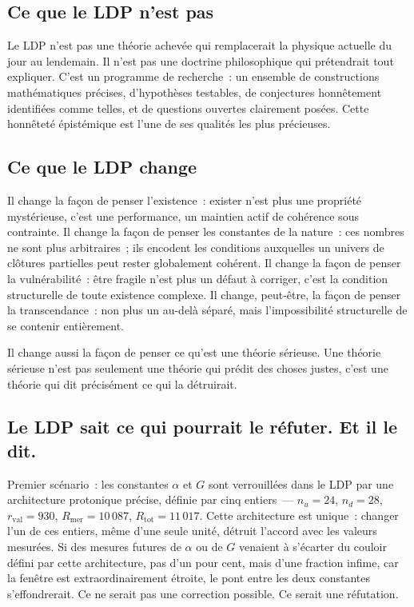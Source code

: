 \documentclass[12pt, a4paper, openright]{book}
\begin{document}
\subsection*{Ce que le LDP n'est pas}

Le LDP n'est pas une théorie achevée qui remplacerait la physique actuelle du jour au lendemain. Il n'est pas une doctrine philosophique qui prétendrait tout expliquer. C'est un programme de recherche~: un ensemble de constructions mathématiques précises, d'hypothèses testables, de conjectures honnêtement identifiées comme telles, et de questions ouvertes clairement posées. Cette honnêteté épistémique est l'une de ses qualités les plus précieuses.

\subsection*{Ce que le LDP change}

Il change la façon de penser l'existence~: exister n'est plus une propriété mystérieuse, c'est une performance, un maintien actif de cohérence sous contrainte. Il change la façon de penser les constantes de la nature~: ces nombres ne sont plus arbitraires~; ils encodent les conditions auxquelles un univers de clôtures partielles peut rester globalement cohérent. Il change la façon de penser la vulnérabilité~: être fragile n'est plus un défaut à corriger, c'est la condition structurelle de toute existence complexe. Il change, peut-être, la façon de penser la transcendance~: non plus un au-delà séparé, mais l'impossibilité structurelle de se contenir entièrement. 

\medskip

Il change aussi la façon de penser ce qu'est une théorie sérieuse. Une théorie sérieuse n'est pas seulement une théorie qui prédit des choses justes, c'est une théorie qui dit précisément ce qui la détruirait.

\subsection*{Le LDP sait ce qui pourrait le réfuter. Et il le dit.}

Premier scénario~: les constantes $\alpha$ et $G$ sont verrouillées dans le LDP par une architecture protonique précise, définie par cinq entiers~--- $n_u = 24$, $n_d = 28$, $r_\text{val} = 930$, $R_\text{mer} = 10\,087$, $R_\text{tot} = 11\,017$. Cette architecture est unique~: changer l'un de ces entiers, même d'une seule unité, détruit l'accord avec les valeurs mesurées. Si des mesures futures de $\alpha$ ou de $G$ venaient à s'écarter du couloir défini par cette architecture, pas d'un pour cent, mais d'une fraction infime, car la fenêtre est extraordinairement étroite, le pont entre les deux constantes s'effondrerait. Ce ne serait pas une correction possible. Ce serait une réfutation.
\end{document}
